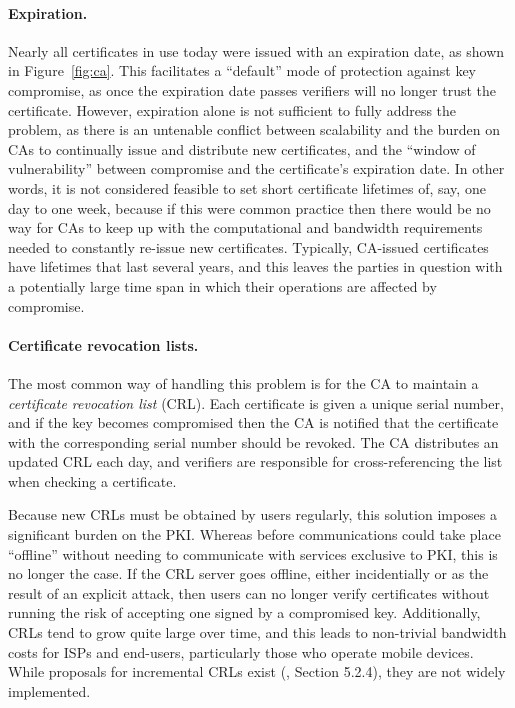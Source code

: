 \documentclass[11pt,twoside]{scrartcl}
\begin{document}
\paragraph{Expiration.} Nearly all certificates in use today were issued with an expiration date, as shown in Figure~\ref{fig:ca}. This facilitates a ``default'' mode of protection against key compromise, as once the expiration date passes verifiers will no longer trust the certificate. However, expiration alone is not sufficient to fully address the problem, as there is an untenable conflict between scalability and the burden on CAs to continually issue and distribute new certificates, and the ``window of vulnerability'' between compromise and the certificate's expiration date. In other words, it is not considered feasible to set short certificate lifetimes of, say, one day to one week, because if this were common practice then there would be no way for CAs to keep up with the computational and bandwidth requirements needed to constantly re-issue new certificates. Typically, CA-issued certificates have lifetimes that last several years, and this leaves the parties in question with a potentially large time span in which their operations are affected by compromise.

\paragraph{Certificate revocation lists.} The most common way of handling this problem is for the CA to maintain a \emph{certificate revocation list} (CRL). Each certificate is given a unique serial number, and if the key becomes compromised then the CA is notified that the certificate with the corresponding serial number should be revoked. The CA distributes an updated CRL each day, and verifiers are responsible for cross-referencing the list when checking a certificate.

Because new CRLs must be obtained by users regularly, this solution imposes a significant burden on the PKI. Whereas before communications could take place ``offline'' without needing to communicate with services exclusive to PKI, this is no longer the case. If the CRL server goes offline, either incidentially or as the result of an explicit attack, then users can no longer verify certificates without running the risk of accepting one signed by a compromised key. Additionally, CRLs tend to grow quite large over time, and this leads to non-trivial bandwidth costs for ISPs and end-users, particularly those who operate mobile devices. While proposals for incremental CRLs exist (\cite{deltacrl}, Section 5.2.4), they are not widely implemented.
\end{document}

